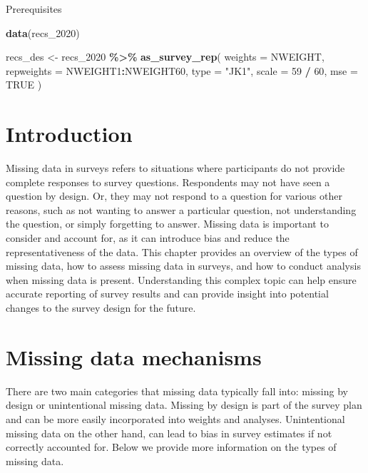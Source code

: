 \documentclass[
]{krantz}
\makeatletter
\newenvironment{Shaded}{\begin{snugshade}}{\end{snugshade}}
\newcommand{\AttributeTok}[1]{\textcolor[rgb]{0.27,0.27,0.27}{#1}}
\newcommand{\ConstantTok}[1]{\textcolor[rgb]{0.37,0.37,0.37}{#1}}
\newcommand{\DecValTok}[1]{\textcolor[rgb]{0.06,0.06,0.06}{#1}}
\newcommand{\FunctionTok}[1]{\textcolor[rgb]{0.27,0.27,0.27}{\textbf{#1}}}
\newcommand{\NormalTok}[1]{#1}
\newcommand{\OtherTok}[1]{\textcolor[rgb]{0.37,0.37,0.37}{#1}}
\newcommand{\SpecialCharTok}[1]{\textcolor[rgb]{0.43,0.43,0.43}{\textbf{#1}}}
\newcommand{\StringTok}[1]{\textcolor[rgb]{0.5,0.5,0.5}{#1}}
\newenvironment{kframe}{%
\medskip{}
\setlength{\fboxsep}{.8em}
 \def\at@end@of@kframe{}%
 \ifinner\ifhmode%
  \def\at@end@of@kframe{\end{minipage}}%
  \begin{minipage}{\columnwidth}%
 \fi\fi%
 \def\FrameCommand##1{\hskip\@totalleftmargin \hskip-\fboxsep
 \colorbox{shadecolor}{##1}\hskip-\fboxsep
     \hskip-\linewidth \hskip-\@totalleftmargin \hskip\columnwidth}%
 \MakeFramed {\advance\hsize-\width
   \@totalleftmargin\z@ \linewidth\hsize
   \@setminipage}}%
 {\par\unskip\endMakeFramed%
 \at@end@of@kframe}
\renewenvironment{Shaded}{\begin{kframe}}{\end{kframe}}
\makeatother
\begin{document}
\begin{prereqbox}{Prerequisites}
\begin{Shaded}
\begin{Highlighting}[]
\FunctionTok{data}\NormalTok{(recs\_2020)}

\NormalTok{recs\_des }\OtherTok{\textless{}{-}}\NormalTok{ recs\_2020 }\SpecialCharTok{\%\textgreater{}\%}
  \FunctionTok{as\_survey\_rep}\NormalTok{(}
    \AttributeTok{weights =}\NormalTok{ NWEIGHT,}
    \AttributeTok{repweights =}\NormalTok{ NWEIGHT1}\SpecialCharTok{:}\NormalTok{NWEIGHT60,}
    \AttributeTok{type =} \StringTok{"JK1"}\NormalTok{,}
    \AttributeTok{scale =} \DecValTok{59} \SpecialCharTok{/} \DecValTok{60}\NormalTok{,}
    \AttributeTok{mse =} \ConstantTok{TRUE}
\NormalTok{  )}
\end{Highlighting}
\end{Shaded}

\end{prereqbox}

\hypertarget{introduction-9}{%
\section{Introduction}\label{introduction-9}}

Missing data in surveys refers to situations where participants do not provide complete responses to survey questions. Respondents may not have seen a question by design. Or, they may not respond to a question for various other reasons, such as not wanting to answer a particular question, not understanding the question, or simply forgetting to answer. Missing data is important to consider and account for, as it can introduce bias and reduce the representativeness of the data. This chapter provides an overview of the types of missing data, how to assess missing data in surveys, and how to conduct analysis when missing data is present. Understanding this complex topic can help ensure accurate reporting of survey results and can provide insight into potential changes to the survey design for the future.

\hypertarget{missing-data-mechanisms}{%
\section{Missing data mechanisms}\label{missing-data-mechanisms}}

There are two main categories that missing data typically fall into: missing by design or unintentional missing data. Missing by design is part of the survey plan and can be more easily incorporated into weights and analyses. Unintentional missing data on the other hand, can lead to bias in survey estimates if not correctly accounted for. Below we provide more information on the types of missing data.
\end{document}
